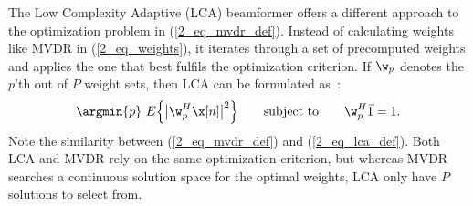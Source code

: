 {The Low Complexity Adaptive (LCA) beamformer offers a different approach to the optimization problem in (\ref{2_eq_mvdr_def}). Instead of calculating weights like MVDR in (\ref{2_eq_weights}), it iterates through a set of precomputed weights and applies the one that best fulfils the optimization criterion. If $\w_p$ denotes the $p$'th out of $P$ weight sets, then LCA can be formulated as~\cite{Synnevag2008}:
%
\begin{gather}
\argmin{p}\ E\Big\{\big|\w_p^H\x[n]\big|^2\Big\} \qquad\text{subject to}\qquad \w_p^H\1 = 1. \label{2_eq_lca_def}
\end{gather}
%
Note the similarity between (\ref{2_eq_mvdr_def}) and (\ref{2_eq_lca_def}). Both LCA and MVDR rely on the same optimization criterion, but whereas MVDR searches a continuous solution space for the optimal weights, LCA only have $P$ solutions to select from.










}

